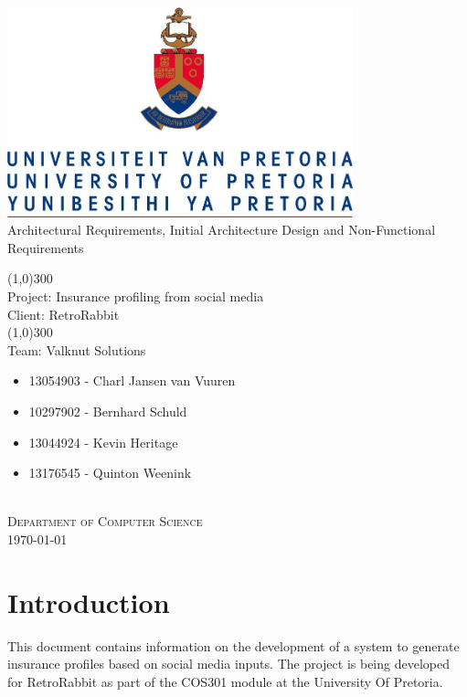 \documentclass{article}
\begin{document}
	\begin{titlepage}
		\begin{center}
			\includegraphics[width=10cm]{images/UP.jpg}  \\
			[0.5cm]
			\huge{
			Architectural Requirements, Initial Architecture Design and Non-Functional Requirements\\
			}
			
			\line(1,0){300}\\
			[0.2cm]
			\LARGE{Project: Insurance profiling from social media\\
			Client: RetroRabbit} \\
			\line(1,0){300}\\
			\LARGE{Team: Valknut Solutions}\\
			[1.0cm]
			\large
			{
			\begin{itemize}
				\item 13054903 - Charl Jansen van Vuuren 
				\item 10297902 - Bernhard Schuld      
				\item 13044924 - Kevin Heritage
				\item 13176545 - Quinton Weenink\\
			\end{itemize}
			}
			\textsc{\large}\\
		[3.0cm]
		\textsc{\large  Department of Computer Science}\\
		[0.5cm]
		\textsc{\large \today}\\
		\end{center}

			
	\end{titlepage}
	\cleardoublepage
	\tableofcontents
	\cleardoublepage
\section{Introduction}
This document contains information on the development of a system to generate insurance profiles based on social media inputs. The project is being developed for RetroRabbit as part of the COS301 module at the University Of Pretoria.
\end{document}
